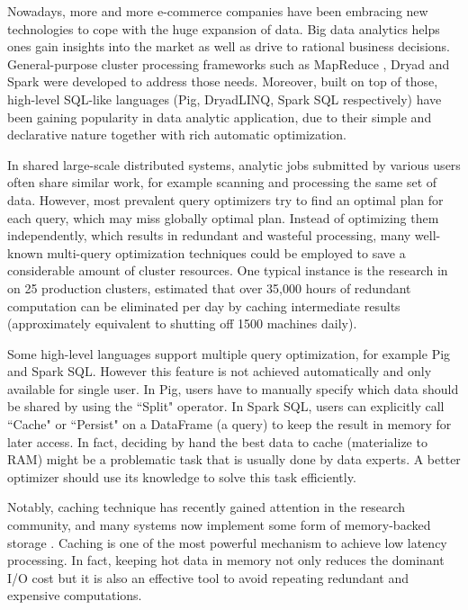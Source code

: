 Nowadays, more and more e-commerce companies have been embracing new technologies to cope with the huge expansion of data. Big data analytics helps ones gain insights into the market as well as drive to rational business decisions. General-purpose cluster processing frameworks such as MapReduce \cite{dean2008mapreduce}, Dryad \cite{isard2007dryad} and Spark \cite{zaharia2012resilient} were developed to address those needs. Moreover, built on top of those, high-level SQL-like languages (Pig, DryadLINQ, Spark SQL respectively) have been gaining popularity in data analytic application, due to their simple and declarative nature together with rich automatic optimization.

In shared large-scale distributed systems, analytic jobs submitted by various users often share similar work, for example scanning and processing the same set of data. However, most prevalent query optimizers try to find an optimal plan for each query, which may miss globally optimal plan. Instead of optimizing them independently, which results in redundant and wasteful processing, many well-known multi-query optimization techniques could be employed to save a considerable amount of cluster resources. One typical instance is the research in \cite{gunda2010nectar} on 25 production clusters, estimated that over 35,000 hours of redundant computation can be eliminated per day by caching intermediate results (approximately equivalent to shutting off 1500 machines daily).

Some high-level languages support multiple query optimization, for example Pig and Spark SQL. However this feature is not achieved automatically and only available for single user. In Pig, users have to manually specify which data should be shared by using the ``Split" operator. In Spark SQL, users can explicitly call ``Cache" or ``Persist" on a DataFrame (a query) to keep the result in memory for later access. In fact, deciding by hand the best data to cache (materialize to RAM) might be a problematic task that is usually done by data experts. A better optimizer should use its knowledge to solve this task efficiently.

Notably, caching technique has recently gained attention in the research community, and many systems now implement some form of memory-backed storage \cite{tachyon, hdfs}. Caching is one of the most powerful mechanism to achieve low latency processing. In fact, keeping hot data in memory not only reduces the dominant I/O cost but it is also an effective tool to avoid repeating redundant and expensive computations.


